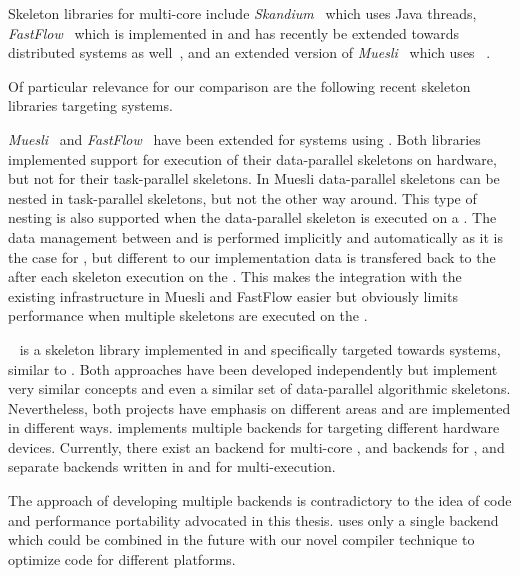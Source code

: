 Skeleton libraries for multi-core \CPUs include \emph{Skandium}~\cite{LeytonP10} which uses Java threads, \emph{FastFlow}~\cite{AldinucciDaKiTo2011,AldinucciDKMT11} which is implemented in \Cpp and has recently be extended towards distributed systems as well~\cite{AldinucciCDKT12}, and an extended version of \emph{Muesli}~\cite{CiechanowiczK10} which uses \OpenMP~\cite{OpenMP}.

\bigskip

Of particular relevance for our comparison are the following recent skeleton libraries targeting \GPU systems.

\bigskip

\emph{Muesli}~\cite{ErnstingK12} and \emph{FastFlow}~\cite{BuonoDLT13,AldinucciSDTP12} have been extended for \GPU systems using \CUDA.
Both libraries implemented support for execution of their data-parallel skeletons on \GPU hardware, but not for their task-parallel skeletons.
In Muesli data-parallel skeletons can be nested in task-parallel skeletons, but not the other way around.
This type of nesting is also supported when the data-parallel skeleton is executed on a \GPU.
The data management between \CPU and \GPU is performed implicitly and automatically as it is the case for \SkelCL, but different to our implementation data is transfered back to the \CPU after each skeleton execution on the \GPU.
This makes the integration with the existing infrastructure in Muesli and FastFlow easier but obviously limits performance when multiple skeletons are executed on the \GPU.

\bigskip

\emph{\SkePU}~\cite{EnmyrenKe10,DastgeerEnKe2011,DastgeerKe14} is a skeleton library implemented in \Cpp and specifically targeted towards \GPU systems, similar to \SkelCL.
Both approaches have been developed independently but implement very similar concepts and even a similar set of data-parallel algorithmic skeletons.
Nevertheless, both projects have emphasis on different areas and are implemented in different ways.
\SkePU implements multiple backends for targeting different hardware devices.
Currently, there exist an \OpenMP backend for multi-core \CPUs, \OpenCL and \CUDA backends for \GPUs, and separate backends written in \OpenCL and \CUDA for multi-\GPU execution.

The approach of developing multiple backends is contradictory to the idea of code and performance portability advocated in this thesis.
\SkelCL uses only a single \OpenCL backend which could be combined in the future with our novel compiler technique to optimize code for different platforms.

